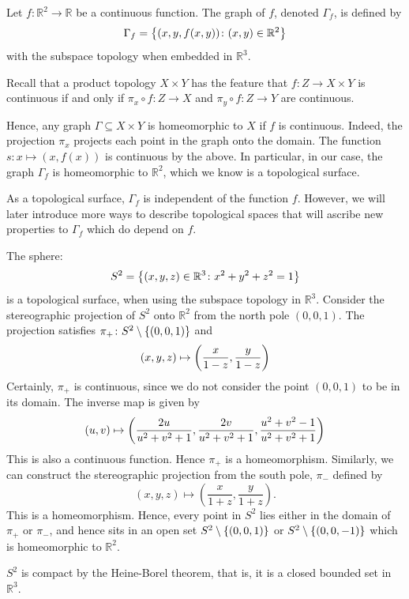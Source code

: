 \documentclass[a4paper,11pt]{article}
\begin{document}
\begin{example}
    Let \( f \colon \mathbb R^2 \to \mathbb R \) be a continuous function.
	The graph of \( f \), denoted \( \Gamma_f \), is defined by
	\[
		\Gamma_f = \qty{(x,y,f(x,y)) \colon (x,y) \in \mathbb R^2}
	\]
	with the subspace topology when embedded in \( \mathbb R^3 \).

	Recall that a product topology \( X \times Y \) has the feature that \( f \colon Z \to X \times Y \) is continuous if and only if \( \pi_x \circ f \colon Z \to X \) and \( \pi_y \circ f \colon Z \to Y \) are continuous.

	Hence, any graph \( \Gamma \subseteq X \times Y \) is homeomorphic to \( X \) if \( f \) is continuous.
	Indeed, the projection \( \pi_x \) projects each point in the graph onto the domain.
	The function \( s \colon x \mapsto (x,f(x)) \) is continuous by the above.
	In particular, in our case, the graph \( \Gamma_f \) is homeomorphic to \( \mathbb R^2 \), which we know is a topological surface.
\end{example}
\begin{remark}
	As a topological surface, \( \Gamma_f \) is independent of the function \( f \).
	However, we will later introduce more ways to describe topological spaces that will ascribe new properties to \( \Gamma_f \) which do depend on \( f \).
\end{remark}
\begin{example}
	The sphere:
	\[
		S^2 = \qty{(x,y,z) \in \mathbb R^3 \colon x^2 + y^2 + z^2 = 1}
	\]
	is a topological surface, when using the subspace topology in \( \mathbb R^3 \).
	Consider the stereographic projection of \( S^2 \) onto \( \mathbb R^2 \) from the north pole \( (0,0,1) \).
	The projection satisfies \( \pi_+ \colon S^2 \setminus \qty{(0,0,1)} \) and
	\[
		(x,y,z) \mapsto \qty(\frac{x}{1-z}, \frac{y}{1-z})
	\]
	Certainly, \( \pi_+ \) is continuous, since we do not consider the point \( (0,0,1) \) to be in its domain.
	The inverse map is given by
	\[
		(u,v) \mapsto \qty(\frac{2u}{u^2+v^2+1}, \frac{2v}{u^2+v^2+1}, \frac{u^2+v^2-1}{u^2+v^2+1})
	\]
	This is also a continuous function.
	Hence \( \pi_+ \) is a homeomorphism.
	Similarly, we can construct the stereographic projection from the south pole, \( \pi_- \) defined by 
    \[
        (x,y,z) \mapsto \left( \frac{x}{1+z},\frac{y}{1+z} \right). 
    \]
	This is a homeomorphism.
	Hence, every point in \( S^2 \) lies either in the domain of \( \pi_+ \) or \( \pi_- \), and hence sits in an open set \( S^2 \setminus \qty{(0,0,1)} \) or \( S^2 \setminus \qty{(0,0,-1)} \) which is homeomorphic to \( \mathbb R^2 \).
\end{example}
\begin{note}
	\( S^2 \) is compact by the Heine-Borel theorem, that is, it is a closed bounded set in \( \mathbb R^3 \).
\end{note}
\end{document}
